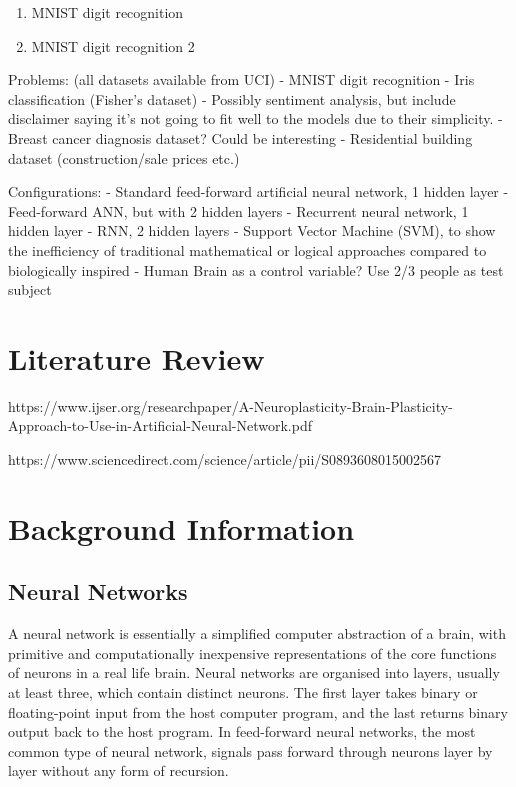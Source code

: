 \documentclass[]{report}
\begin{document}
\begin{enumerate}
	\item MNIST digit recognition
	\item MNIST digit recognition 2
\end{enumerate}

Problems: (all datasets available from UCI)
- MNIST digit recognition
- Iris classification (Fisher's dataset)
- Possibly sentiment analysis, but include disclaimer saying it's not going to fit well to the models due to their simplicity.
- Breast cancer diagnosis dataset? Could be interesting
- Residential building dataset (construction/sale prices etc.)

Configurations:
- Standard feed-forward artificial neural network, 1 hidden layer
- Feed-forward ANN, but with 2 hidden layers
- Recurrent neural network, 1 hidden layer
- RNN, 2 hidden layers
- Support Vector Machine (SVM), to show the inefficiency of traditional mathematical or logical approaches compared to biologically inspired
- Human Brain as a control variable? Use 2/3 people as test subject

\section{Literature Review}

https://www.ijser.org/researchpaper/A-Neuroplasticity-Brain-Plasticity-Approach-to-Use-in-Artificial-Neural-Network.pdf

https://www.sciencedirect.com/science/article/pii/S0893608015002567


\section{Background Information}

\subsection{Neural Networks}
A neural network is essentially a simplified computer abstraction of a brain, with primitive and computationally inexpensive representations of the core functions of neurons in a real life brain. Neural networks are organised into layers, usually at least three, which contain distinct neurons. The first layer takes binary or floating-point input from the host computer program, and the last returns binary output back to the host program. In feed-forward neural networks, the most common type of neural network, signals pass forward through neurons layer by layer without any form of recursion.
\end{document}
